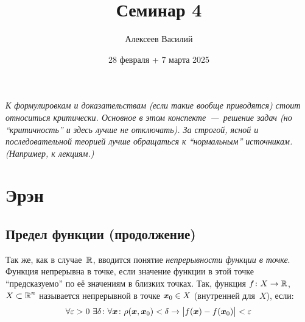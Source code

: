 \documentclass[a4paper,12pt]{article}
\author{Алексеев Василий}
\title{Семинар 4}
\date{28 февраля + 7 марта 2025}
\begin{document}
  \maketitle
  
  \tableofcontents

  \thispagestyle{empty}
  
  \newpage
  
  
  
  \vspace*{\fill}
  
  \noindent
  \emph{
    К формулировкам и доказательствам (если такие вообще приводятся) стоит относиться критически.
    Основное в этом конспекте~---~решение задач (но ``критичность'' и здесь лучше не отключать).
    За строгой, ясной и последовательной теорией лучше обращаться к ``нормальным'' источникам.
    (Например, к лекциям.)
  }
  
  \vspace*{\fill}
  
  \thispagestyle{empty}


  
  \newpage
  


  \section{Эрэн}
  
  \subsection{Предел функции (продолжение)}


  Так же, как в случае~$\operatorname{\mathbb R}$, вводится понятие \emph{непрерывности функции в точке}.
  Функция непрерывна в точке, если значение функции в этой точке ``предсказуемо'' по её значениям в близких точках.
  Так, функция $f\colon X \hm\to \RR$, $X \hm\subset \RR^n$ называется непрерывной в точке $\bds x_0 \hm\in X$ (внутренней для~$X$), если:
  \[
    \forall \varepsilon > 0\ \exists \delta\colon \forall \boldsymbol x\colon \rho(\boldsymbol x, \boldsymbol x_0) < \delta \to \bigl|f(\boldsymbol x) - f(\boldsymbol x_0)\bigr| < \varepsilon
  \]
\end{document}

